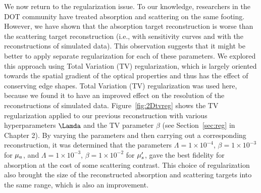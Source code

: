 We now return to the regularization issue. To our knowledge, researchers in the DOT community have treated absorption and scattering on the same footing. However, we have shown that the absorption target reconstruction is worse than the scattering target reconstruction (i.e., with sensitivity curves and with the reconstructions of simulated data). This observation suggests that it might be better to apply separate regularization for each of these parameters. We explored this approach using Total Variation (TV) regularization, which is largely oriented towards the spatial gradient of the optical properties and thus has the effect of conserving edge shapes. Total Variation (TV) regularization was used here, because we found it to have an improved effect on the resolution of the reconstructions of simulated data. Figure~\ref{fig:2Dtvreg} shows the TV regularization applied to our previous reconstruction with various hyperparameters $\Lamda$ and the TV parameter $\beta$ (see Section~\ref{sec:reg} in Chapter 2). By varying the parameters and then carrying out a corresponding reconstruction, it was determined that the parameters $\Lambda=1\times10^{-4}$, $\beta=1\times10^{-3}$ for $\mu_a$, and $\Lambda=1\times10^{-3}$, $\beta=1\times10^{-2}$ for $\mu_s^{\prime}$, gave the best fidelity for absorption at the cost of some scattering contrast. This choice of regularization also brought the size of the reconstructed absorption and scattering targets into the same range, which is also an improvement.
%
